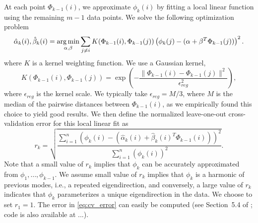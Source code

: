 At each point $\Phi_{k-1}(i)$, we approximate $\phi_k(i)$ by fitting a local linear function using the remaining $m-1$ data points.
%
We solve the following optimization problem
\begin{equation} \label{eq:opt_problem}
\hat{\alpha}_k (i) , \hat{\beta}_k(i)  = \operatorname*{arg\,min}_{\alpha, \beta} \sum_{j \ne i} K(\Phi_{k-1}(i), \Phi_{k-1}(j)) \left( \phi_{k}(j) - (\alpha + \beta^T \Phi_{k-1}(j)) \right)^2.
\end{equation}
%
where $K$ is a kernel weighting function.
%
We use a Gaussian kernel,
%
\begin{equation}
K(\Phi_{k-1}(i), \Phi_{k-1}(j))  = \exp \left( - \frac{\|\Phi_{k-1}(i) - \Phi_{k-1} (j) \|^2}{\epsilon_{reg}^2} \right),
\end{equation}
%
where $\epsilon_{reg}$ is the kernel scale.
%
We typically take $\epsilon_{reg} = M / 3$, where $M$ is the median of the pairwise distances between $\Phi_{k-1}(i)$, as we empirically found this choice to yield good results.
%
We then define the normalized leave-one-out cross-validation error for this local linear fit as
\begin{equation} \label{eq:cv_error}
r_{k} = \sqrt{ \frac{\sum_{i=1}^n \left( \phi_{k} (i) - (\hat{\alpha}_k(i) + \hat{\beta}_k(i)^T \Phi_{k-1}(i))  \right)^2} {\sum_{i=1}^n  \left( \phi_{k} (i) \right)^2 }}.
\end{equation}
%
Note that a small value of $r_k$ implies that $\phi_{k}$ can be accurately approximated from $\phi_1, \dots, \phi_{k-1}$.
%
We assume small value of $r_k$ implies that $\phi_k$ is a harmonic of previous modes, i.e., a repeated eigendirection, and conversely, a large value of $r_{k}$ indicates that $\phi_{k}$ parameterizes a unique eigendirection in the data.
%
We choose to set $r_1 = 1$.
%
The error in \eqref{eq:cv_error} can easily be computed (see Section~5.4 of \cite{wasserman2006all}; code is also available at ...).

